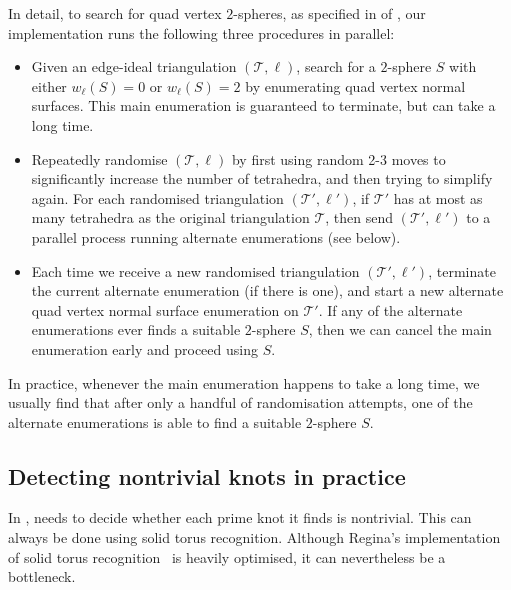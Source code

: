 \documentclass[a4paper,UKenglish,cleveref, autoref, thm-restate]{lipics-v2021}
\newcommand{\tri}{\mathcal{T}}
\begin{document}
In detail, to search for quad vertex $2$-spheres, as specified in  of , our implementation runs the following three procedures in parallel:
\begin{itemize}
\item
Given an edge-ideal triangulation $(\tri,\ell)$, search for a $2$-sphere $S$ with either
$w_\ell(S)=0$ or $w_\ell(S)=2$ by enumerating quad vertex normal surfaces.
This main enumeration is guaranteed to terminate, but can take a long time.
\item
Repeatedly randomise $(\tri,\ell)$ by first using random 2-3 moves to significantly increase the number of tetrahedra, and then trying to simplify again.
For each randomised triangulation $(\tri',\ell')$, if $\tri'$ has at most as many tetrahedra as the original triangulation $\tri$,
then send $(\tri',\ell')$ to a parallel process running alternate enumerations (see below).
\item
Each time we receive a new randomised triangulation $(\tri',\ell')$, terminate the current alternate enumeration (if there is one),
and start a new alternate quad vertex normal surface enumeration on $\tri'$.
If any of the alternate enumerations ever finds a suitable $2$-sphere $S$, then we can cancel the main enumeration early and proceed using $S$.
\end{itemize}
In practice, whenever the main enumeration happens to take a long time, we usually find that after only a handful of randomisation attempts,
one of the alternate enumerations is able to find a suitable $2$-sphere $S$.

\subsection{Detecting nontrivial knots in practice}\label{ssec:nontrivialInPractice}

In ,  needs to decide whether each prime knot it finds is nontrivial.
This can always be done using solid torus recognition.
Although Regina's implementation of solid torus recognition~\cite{Regina,burton2012unknot} is heavily optimised, it can nevertheless be a bottleneck.
\end{document}
